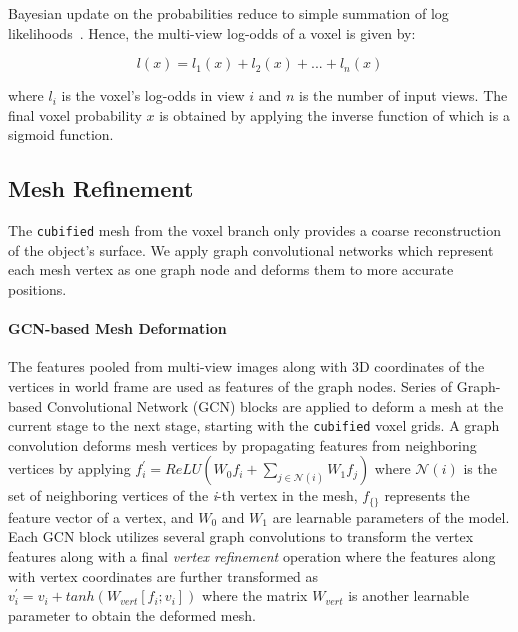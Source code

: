 Bayesian update on the probabilities reduce to simple summation of log likelihoods~\cite{konolige1997improved}. Hence, the multi-view log-odds of a voxel is given by:

\begin{equation}
    l(x) = l_1(x) + l_2(x) + ... + l_n(x)
    \label{equ:logodds_sum}
\end{equation}

\noindent where $l_i$ is the voxel's log-odds in view $i$ and $n$ is the number of input views.
The final voxel probability $x$ is obtained by applying the inverse function of  which is a sigmoid function.

\subsection{Mesh Refinement}
The \texttt{cubified} mesh from the voxel branch only provides a coarse reconstruction of the object's surface. We apply graph convolutional networks which represent each mesh vertex as one graph node and deforms them to more accurate positions.
\vspace{-4mm}
\paragraph{GCN-based Mesh Deformation}
The features pooled from multi-view images along with 3D coordinates of the vertices in world frame are used as features of the graph nodes.
Series of Graph-based Convolutional Network (GCN) blocks are applied to deform a mesh at the current stage to the next stage, starting with the \texttt{cubified} voxel grids.
A graph convolution deforms mesh vertices by propagating features from neighboring vertices by applying
$f_{i}^{'} = ReLU(W_0f_i + \sum_{j \in \mathcal{N}(i)} W_1 f_j)$ where $\mathcal{N}(i)$ is the set of neighboring vertices of the \emph{i}-th vertex in the mesh, $f_{\{\}}$ represents the feature vector of a vertex, and $W_0$ and $W_1$ are learnable parameters of the model.
Each GCN block utilizes several graph convolutions to transform the vertex features along with a final \emph{vertex refinement} operation where the features along with vertex coordinates are further transformed as $v_i^{'} = v_i + tanh(W_{vert}[f_i;v_i])$ where the matrix $W_{vert}$ is another learnable parameter to obtain the deformed mesh.
\vspace{-4mm}
\label{subsec:contrastive_depth_feature_extraction}
